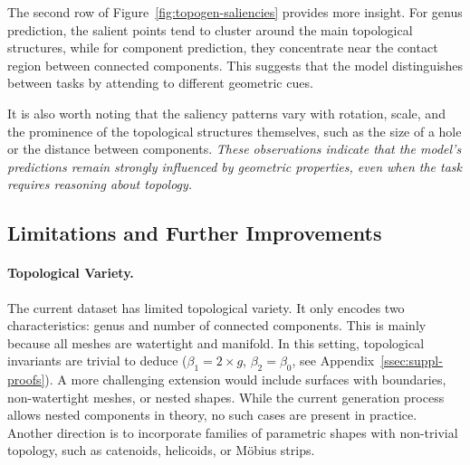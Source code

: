 The second row of Figure~\ref{fig:topogen-saliencies} provides more insight. For genus prediction, the salient points tend to cluster around the main topological structures, while for component prediction, they concentrate near the contact region between connected components. This suggests that the model distinguishes between tasks by attending to different geometric cues.

It is also worth noting that the saliency patterns vary with rotation, scale, and the prominence of the topological structures themselves, such as the size of a hole or the distance between components. \textit{These observations indicate that the model’s predictions remain strongly influenced by geometric properties, even when the task requires reasoning about topology.}



\subsection{Limitations and Further Improvements}
\label{ssec:topogen-limitations}

\paragraph{Topological Variety.} 
The current dataset has limited topological variety. It only encodes two characteristics: genus and number of connected components. This is mainly because all meshes are watertight and manifold. In this setting, topological invariants are trivial to deduce ($\beta_1 = 2 \times g$, $\beta_2=\beta_0$, see Appendix~\ref{ssec:suppl-proofs}). A more challenging extension would include surfaces with boundaries, non-watertight meshes, or nested shapes. While the current generation process allows nested components in theory, no such cases are present in practice. Another direction is to incorporate families of parametric shapes with non-trivial topology, such as catenoids, helicoids, or Möbius strips.


